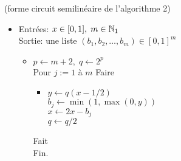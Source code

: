 (forme circuit semilinéaire de l'algorithme 2)
\begin{itemize}
\item[] Entrées: $ x \in [0,1], \; m \in \mathbb {N}_1$ \\
 Sortie: une liste $(b_1, b_2,\ldots, b_m) \in [ 0,1 ]^m$ 
	\begin{itemize}
	 \item[] $p \leftarrow m+2 , \; q \leftarrow 2^p$ \\
			 Pour $j:=1$ à $m$ Faire
				\begin{itemize}
			 \item[] $ y \leftarrow q(x-1/2)$ \\
			 		 $ b_j \leftarrow \min (1, \max(0,y))$ \\
					$x \leftarrow 2x - b_j$ \\
 				    $q \leftarrow q/2$
				 \end{itemize}
	  Fait \\
 	Fin.
	 \end{itemize}
\end{itemize}

